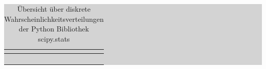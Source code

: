 \begin{table}[H]
\setlength{\arrayrulewidth}{.1em}
\caption{\"{U}bersicht \"{u}ber diskrete Wahrscheinlichkeitsverteilungen der Python Bibliothek scipy.stats}
\setlength{\fboxsep}{0pt}%
\colorbox{lightgray}{%
%
\begin{tabular}{| c | c | c | c | c |}
\hline
\parbox[c][0.8in][c]{1.3in}{\smallskip\centering\textbf{\selectfont{Verteilung}}} &
\parbox[c][0.8in][c]{1.1in}{\smallskip\centering\textbf{\selectfont{Wahrscheinlich-keitsverteilung f(x)}}} &
\parbox[c][0.8in][c]{1.1in}{\smallskip\centering\textbf{\selectfont{Verteilungs-funktion F(x)}}} &
\parbox[c][0.8in][c]{1.1in}{\smallskip\centering\textbf{}} &
\parbox[c][0.8in][c]{1.4in}{\smallskip\centering\textbf{\selectfont{Zufallszahlen-generator}}}\\ \hline

\parbox[c][0.5in][c]{1.3in}{\centering{}\selectfont{Gleichverteilung}} & 
\parbox[c][0.5in][c]{1.1in}{\centering{}\selectfont{randint.pmf}} &
\parbox[c][0.5in][c]{1.1in}{\centering{}\selectfont{randint.cdf}} & 
\parbox[c][0.5in][c]{1.1in}{\centering{}\selectfont{randint.ppf}}  & 
\parbox[c][0.5in][c]{1.4in}{\centering{}\selectfont{randint.rvs}} \\
\hline

\parbox[c][0.5in][c]{1.3in}{\centering{}\selectfont{Binomial-Verteilung}} & 
\parbox[c][0.5in][c]{1.1in}{\centering{}\selectfont{binom.pmf}} &
\parbox[c][0.5in][c]{1.1in}{\centering{}\selectfont{binom.cdf}} & 
\parbox[c][0.5in][c]{1.1in}{\centering{}\selectfont{binom.ppf}}  & 
\parbox[c][0.5in][c]{1.4in}{\centering{}\selectfont{binom.rvs}} \\
\hline

\parbox[c][0.5in][c]{1.3in}{\centering{}\selectfont{Hypergeometrische Verteilung}} & 
\parbox[c][0.5in][c]{1.1in}{\centering{}\selectfont{hypergeom.pmf}} &
\parbox[c][0.5in][c]{1.1in}{\centering{}\selectfont{hypergeom.cdf}} & 
\parbox[c][0.5in][c]{1.1in}{\centering{}\selectfont{hypergeom.ppf}}  & 
\parbox[c][0.5in][c]{1.4in}{\centering{}\selectfont{hypergeom.rvs}} \\
\hline

\parbox[c][0.5in][c]{1.3in}{\centering{}\selectfont{Poisson-Verteilung}} & 
\parbox[c][0.5in][c]{1.1in}{\centering{}\selectfont{poisson.pmf}} &
\parbox[c][0.5in][c]{1.1in}{\centering{}\selectfont{poisson.cdf}} & 
\parbox[c][0.5in][c]{1.1in}{\centering{}\selectfont{poisson.ppf}}  & 
\parbox[c][0.5in][c]{1.4in}{\centering{}\selectfont{poisson.rvs}} \\
\hline


\end{tabular}}
\end{table}
